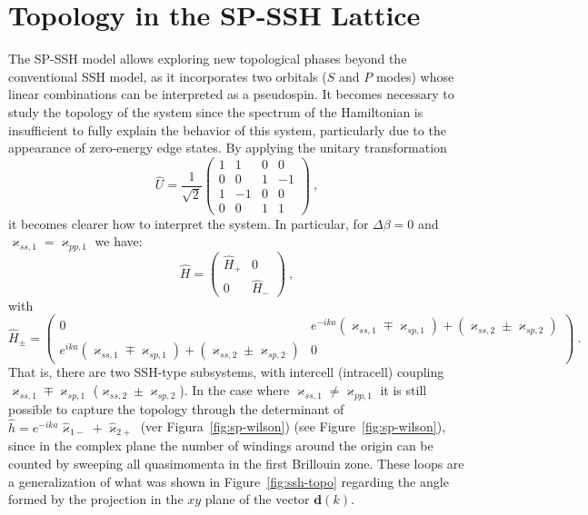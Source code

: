 \section{Topology in the SP-SSH Lattice}
The SP-SSH model allows exploring new topological phases beyond the conventional SSH model, as it incorporates two orbitals ($S$ and $P$ modes) whose linear combinations can be interpreted as a pseudospin. It becomes necessary to study the topology of the system since the spectrum of the Hamiltonian is insufficient to fully explain the behavior of this system, particularly due to the appearance of zero-energy edge states. By applying the unitary transformation
\begin{equation*}
	\hat{U} = \frac{1}{\sqrt{2}}\begin{pmatrix}
		1 & 1 & 0 & 0 \\
		0 & 0 & 1 & -1 \\
		1 & -1 & 0 & 0 \\
		0 & 0 & 1 & 1
	\end{pmatrix} \ ,
\end{equation*} 
it becomes clearer how to interpret the system. In particular, for $\Delta\beta = 0$ and $\varkappa_{ss,1}=\varkappa_{pp,1}$ we have:
\begin{equation*}
	\hat{H} = \begin{pmatrix}
		\hat{H}_+ & 0 \\
		0 & \hat{H}_-
	\end{pmatrix} \ ,
\end{equation*} 
with
\begin{equation*}
	\hat{H}_\pm = \begin{pmatrix}
		0 & e^{-ika}(\varkappa_{ss,1}\mp \varkappa_{sp,1}) + (\varkappa_{ss,2}\pm \varkappa_{sp,2}) \\
		e^{ika}(\varkappa_{ss,1}\mp \varkappa_{sp,1}) + (\varkappa_{ss,2}\pm \varkappa_{sp,2}) & 0
	\end{pmatrix} \ .
\end{equation*}
That is, there are two SSH-type subsystems, with intercell (intracell) coupling $\varkappa_{ss,1}\mp \varkappa_{sp,1}$ ($\varkappa_{ss,2}\pm \varkappa_{sp,2}$).  In the case where $\varkappa_{ss,1}\neq\varkappa_{pp,1}$ it is still possible to capture the topology through the determinant of $\hat{h}=e^{-ika}\hat{\varkappa}_{1-} + \hat{\varkappa}_{2+}$ (ver Figura~\ref{fig:sp-wilson}) (see Figure~\ref{fig:sp-wilson}), since in the complex plane the number of windings around the origin can be counted by sweeping all quasimomenta in the first Brillouin zone. These loops are a generalization of what was shown in Figure~\ref{fig:ssh-topo} regarding the angle formed by the projection in the $xy$ plane of the vector $\mathbf{d}(k)$.

